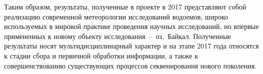 \documentclass[a4paper,12pt,openany,final]{extreport}
\newcommand\theyear{2017}
\begin{document}

Таким образом, результаты, полученные в проекте в \theyear{} представляют собой реализацию современной метеорологии исследований водоемов, широко используемых в мировой практике проведения научных исследований, но впервые примененных к новому объекту исследования~--~оз.~Байкал.  Полученные результаты носят мультидисциплинарный характер и на этапе \theyear{} года относятся к стадии сбора и первичной обработки информации, а также к совершенствованию существующих процессов секвенирования нового поколения.

\appendices
\end{document}

